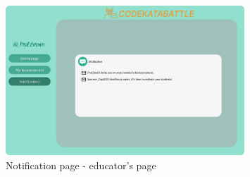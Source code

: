 \begin{figure}[H]
    \centering
    \includegraphics[width=0.8\textwidth]{images/user_interface/UI_sw2-15.png}
    \caption{Notification page - educator's page}
\end{figure}

